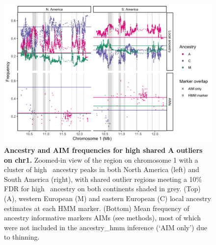 \begin{figure}[ht]
\includegraphics[width = \textwidth]{chapter1/figures/ACM_frequency_plot_AR_CA_FDR_chr1_outlier2.png}
\caption{ \textbf{Ancestry and AIM frequencies for high shared A outliers on chr1.} Zoomed-in view of the region on chromosome 1 with a cluster of high \A\ ancestry peaks in both North America (left) and South America (right), with shared outlier regions meeting a 10\% FDR for high \A\ ancestry on both continents shaded in grey. (Top)  (A), western European (M) and eastern European (C) local ancestry estimates at each HMM marker. (Bottom) Mean frequency of ancestry informative markers AIMs (see methods), most of which were not included in the ancestry\_hmm inference (‘AIM only') due to thinning.}
\label{ACM_chr1_outlier_AIMs}
\end{figure}

